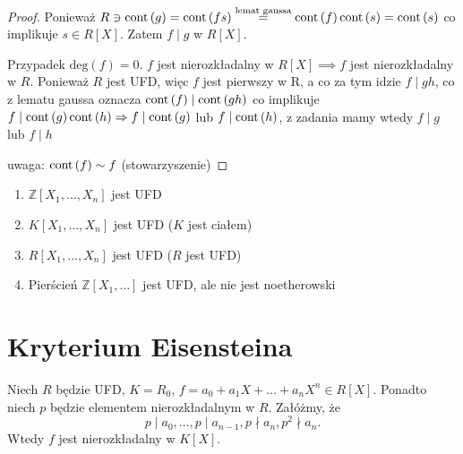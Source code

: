 \begin{proof}
	Ponieważ $R \ni \operatorname{cont} \left( g \right) = \operatorname{cont} \left( fs \right) \overset{\text{lemat gaussa}}{=} \operatorname{cont} \left( f \right) \operatorname{cont} \left( s \right) = \operatorname{cont} \left( s \right)  $ co implikuje $s\in R\left[ X \right] $. Zatem $f\mid g$ w $R\left[ X \right] $.

	Przypadek $\text{deg}\left(f\right) = 0$. $f$ jest nierozkładalny w $R\left[ X \right] \implies f$ jest nierozkładalny w $R$. Ponieważ $R$ jest UFD, więc $f$ jest pierwszy w R, a co za tym idzie $f\mid gh$, co z lematu gaussa oznacza $\operatorname{cont} \left( f \right) \mid \operatorname{cont} \left( gh \right) $ co implikuje $f\mid \operatorname{cont} \left( g \right) \operatorname{cont} \left( h \right) \Rightarrow f\mid \operatorname{cont} \left( g \right) $ lub $f\mid \operatorname{cont} \left( h \right) $, z zadania mamy wtedy $f\mid g$ lub $f\mid h$

	uwaga: $\operatorname{cont} \left( f \right) \sim f $ (stowarzyszenie)
\end{proof} 
\begin{corollary}
\begin{enumerate}[label=\arabic*)]
	\item $\mathbb{Z} \left[ X_1,\ldots,X_{n}  \right] $ jest UFD
	\item $K\left[ X_1,\ldots,X_{n}  \right] $ jest UFD ($K$ jest ciałem)
	\item $R\left[ X_1,\ldots,X_{n}  \right] $ jest UFD ($R$ jest UFD)
	\item Pierścień $\mathbb{Z} \left[ X_1,\ldots \right] $ jest UFD, ale nie jest noetherowski
\end{enumerate}	
\end{corollary}

\section{Kryterium Eisensteina}
Niech $R$ będzie UFD, $K = R_0$, $f = a_0 + a_1X + \ldots + a_{n}X^{n}\in R\left[ X \right] $. Ponadto niech $p$ będzie elementem nierozkładalnym w $R$. Załóżmy, że 
\[p\mid a_0,\ldots, p\mid a_{n-1}, p\nmid a_{n} , p^2\nmid a_{n} .\]
Wtedy $f$ jest nierozkładalny w  $K\left[ X \right] $.

